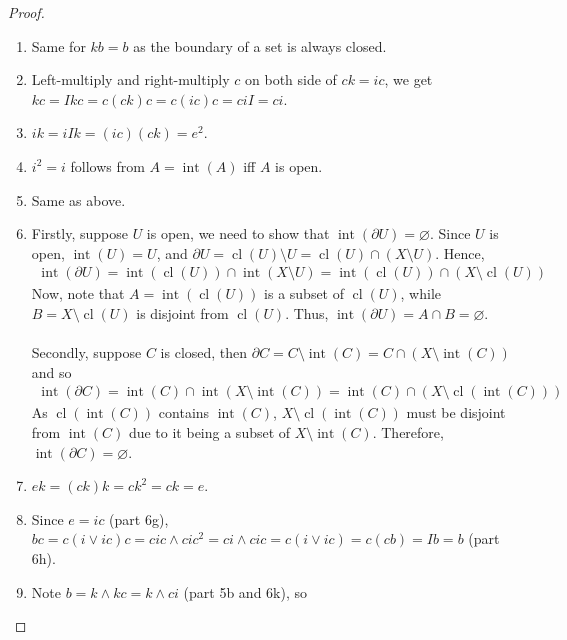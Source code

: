 \documentclass{treatise}
\begin{document}
\begin{proof}
\begin{enumerate}[label=(\alph*)]
    \item Same for $kb = b$ as the boundary of a set is always closed.
    \item Left-multiply and right-multiply $c$ on both side of $ck = ic$, we get $kc = Ikc = c(ck)c = c(ic)c = ciI = ci$.
    \item $ik = iIk = (ic)(ck) = e^2$.
    \item $i^2 = i$ follows from $A = \operatorname{int}(A)$ iff $A$ is open.
    \item Same as above.
    \item Firstly, suppose $U$ is open, we need to show that $\operatorname{int}(\partial U) = \varnothing$. Since $U$ is open, $\operatorname{int}(U) = U$, and $\partial U = \operatorname{cl}(U) \setminus U = \operatorname{cl}(U) \cap (X \setminus U)$. Hence,
    \begin{align*}
        \operatorname{int}(\partial U) = \operatorname{int}(\operatorname{cl}(U)) \cap \operatorname{int}(X \setminus U) = \operatorname{int}(\operatorname{cl}(U)) \cap (X \setminus \operatorname{cl}(U))
    \end{align*}
    Now, note that $A = \operatorname{int}(\operatorname{cl}(U))$ is a subset of $\operatorname{cl}(U)$, while $B = X \setminus \operatorname{cl}(U)$ is disjoint from $\operatorname{cl}(U)$. Thus, $\operatorname{int}(\partial U) = A \cap B = \varnothing$.
    \\
    \\
    Secondly, suppose $C$ is closed, then $\partial C = C \setminus \operatorname{int}(C) = C \cap (X \setminus \operatorname{int}(C))$ and so
    \begin{align*}
        \operatorname{int}(\partial C) = \operatorname{int}(C) \cap \operatorname{int}(X \setminus \operatorname{int}(C)) = \operatorname{int}(C) \cap (X \setminus \operatorname{cl}(\operatorname{int}(C)))
    \end{align*}
    As $\operatorname{cl}(\operatorname{int}(C))$ contains $\operatorname{int}(C)$, $X \setminus \operatorname{cl}(\operatorname{int}(C))$ must be disjoint from $\operatorname{int}(C)$ due to it being a subset of $X \setminus \operatorname{int}(C)$. Therefore, $\operatorname{int}(\partial C) = \varnothing$.
    \item $ek = (ck)k = ck^2 = ck = e$.
    \item Since $e = ic$ (part 6g), $bc = c(i \vee ic)c = cic \wedge cic^2 = ci \wedge cic = c(i \vee ic) = c(cb) = Ib = b$ (part 6h).
    \item Note $b = k \wedge kc = k \wedge ci$ (part 5b and 6k), so

\end{enumerate}
\end{proof}
\end{document}
